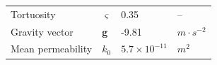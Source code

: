 \begin{table}[!h]
{\begin{center}
\begin{tabular}{|l|l|l|l|}
Tortuosity                 &$\varsigma$      &0.35               &--     \\
Gravity vector                  &{\bf g}        &-9.81              &$m\cdot s^{-2}$    \\
Mean permeability                    &$k_{0}$        &$5.7\times 10^{-11}$  &$m^2$      \\\hline
\end{tabular}
\end{center}
}
\end{table}

